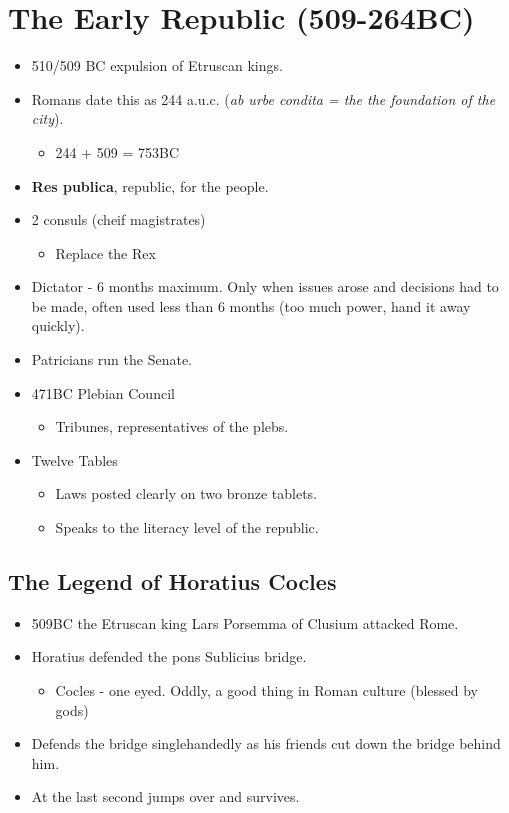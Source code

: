 \documentclass[12pt, twoside]{article}
\begin{document}
\section{The Early Republic (509-264BC)}
\begin{itemize}
\item 510/509 BC expulsion of Etruscan kings.
\item Romans date this as 244 a.u.c. (\emph{ab urbe condita = the the foundation of the city}).
	\begin{itemize}
	\item 244 + 509 = 753BC
	\end{itemize}
\item \textbf{Res publica}, republic, for the people.
\item 2 consuls (cheif magistrates)
	\begin{itemize}
	\item Replace the Rex
	\end{itemize}
\item Dictator - 6 months maximum.  Only when issues arose and decisions had to be made, often used less than 6 months (too much power, hand it away quickly).
\item Patricians run the Senate.
\item 471BC Plebian Council
	\begin{itemize}
	\item Tribunes, representatives of the plebs.
	\end{itemize}
\item Twelve Tables
	\begin{itemize}
	\item Laws posted clearly on two bronze tablets.
	\item Speaks to the literacy level of the republic.
	\end{itemize}
\end{itemize}
\subsection{The Legend of Horatius Cocles}
\begin{itemize}
\item 509BC the Etruscan king Lars Porsemma of Clusium attacked Rome.
\item Horatius defended the pons Sublicius bridge.
	\begin{itemize}
	\item Cocles - one eyed.  Oddly, a good thing in Roman culture (blessed by gods)
	\end{itemize}
\item Defends the bridge singlehandedly as his friends cut down the bridge behind him.
\item At the last second jumps over and survives.
\end{itemize}
\end{document}

